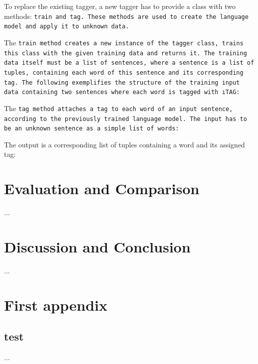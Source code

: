 To replace the existing tagger, a new tagger has to provide a class with two methods: \tt{train} and \tt{tag}. These methods are used to create the language model and apply it to unknown data.

The \tt{train} method creates a new instance of the tagger class, trains this class with the given training data and returns it. The training data itself must be a list of sentences, where a sentence is a list of tuples, containing each word of this sentence and its corresponding tag. The following exemplifies the structure of the training input data containing two sentences where each word is tagged with \i{TAG}:



The \tt{tag} method attaches a tag to each word of an input sentence, according to the previously trained language model. The input has to be an unknown sentence as a simple list of words:



The output is a corresponding list of tuples containing a word and its assigned tag:




\chapter{Evaluation and Comparison}\label{c.evaluation}
...

\chapter{Discussion and Conclusion}\label{c.conclusion}
...

% 
% 
% 
% 
% 



\appendix
\chapter{First appendix}

\section{test}
...


